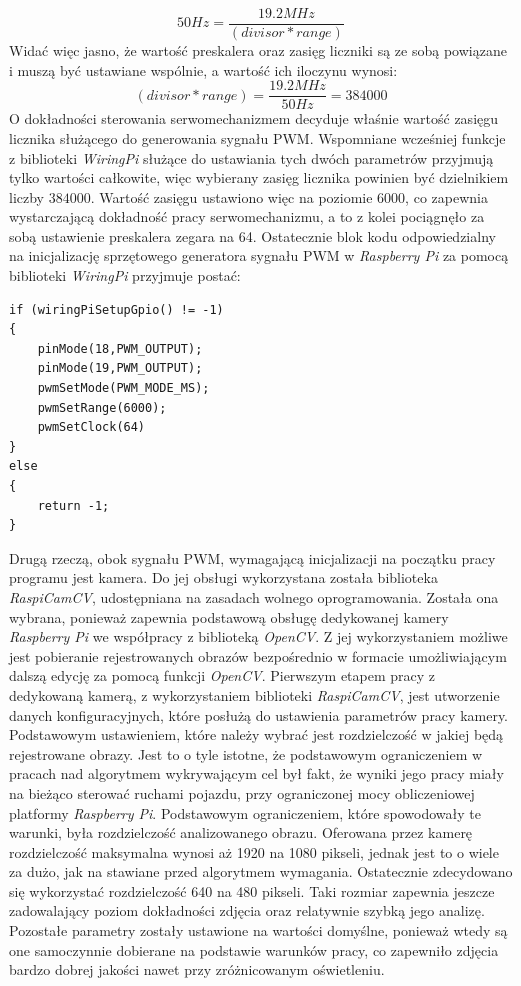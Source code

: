 \begin{equation}
50 Hz = \frac{19.2 MHz}{(divisor * range)}
\label{eq:hard_pwmN}
\end{equation}
Widać więc jasno, że wartość preskalera oraz zasięg liczniki są ze sobą powiązane i muszą być ustawiane wspólnie, a wartość ich iloczynu wynosi:
\begin{equation}
(divisor * range) = \frac{19.2 MHz}{50 Hz} = 384000
\label{eq:range_x_presc}
\end{equation}
O dokładności sterowania serwomechanizmem decyduje właśnie wartość zasięgu licznika służącego do generowania sygnału PWM. Wspomniane wcześniej funkcje z biblioteki \textit{WiringPi} służące do ustawiania tych dwóch parametrów przyjmują tylko wartości całkowite, więc wybierany zasięg licznika powinien być dzielnikiem liczby $384000$. Wartość zasięgu ustawiono więc na poziomie 6000, co zapewnia wystarczającą dokładność pracy serwomechanizmu, a to z kolei pociągnęło za sobą ustawienie preskalera zegara na 64. Ostatecznie blok kodu odpowiedzialny na inicjalizację sprzętowego generatora sygnału PWM w \textit{Raspberry Pi} za pomocą biblioteki \textit{WiringPi} przyjmuje postać:
\begin{lstlisting}[caption=Inicjalizacja sygnałów PWM \textit{Raspberry Pi}]
if (wiringPiSetupGpio() != -1)
{
	pinMode(18,PWM_OUTPUT);
	pinMode(19,PWM_OUTPUT);
	pwmSetMode(PWM_MODE_MS);
	pwmSetRange(6000);
	pwmSetClock(64)
}
else
{
	return -1;
}
\end{lstlisting}

Drugą rzeczą, obok sygnału PWM, wymagającą inicjalizacji na początku pracy programu jest kamera. Do jej obsługi wykorzystana została biblioteka \textit{RaspiCamCV}, udostępniana na zasadach wolnego oprogramowania. Została ona wybrana, ponieważ zapewnia podstawową obsługę dedykowanej kamery \textit{Raspberry Pi} we współpracy z biblioteką \textit{OpenCV}. Z jej wykorzystaniem możliwe jest pobieranie rejestrowanych obrazów bezpośrednio w formacie umożliwiającym dalszą edycję za pomocą funkcji \textit{OpenCV}. Pierwszym etapem pracy z dedykowaną kamerą, z wykorzystaniem biblioteki \textit{RaspiCamCV}, jest utworzenie danych konfiguracyjnych, które posłużą do ustawienia parametrów pracy kamery. Podstawowym ustawieniem, które należy wybrać jest rozdzielczość w jakiej będą rejestrowane obrazy. Jest to o tyle istotne, że podstawowym ograniczeniem w pracach nad algorytmem wykrywającym cel był fakt, że wyniki jego pracy miały na bieżąco sterować ruchami pojazdu, przy ograniczonej mocy obliczeniowej platformy \textit{Raspberry Pi}. Podstawowym ograniczeniem, które spowodowały te warunki, była rozdzielczość analizowanego obrazu. Oferowana przez kamerę rozdzielczość maksymalna wynosi aż 1920 na 1080 pikseli, jednak jest to o wiele za dużo, jak na stawiane przed algorytmem wymagania. Ostatecznie zdecydowano się wykorzystać rozdzielczość 640 na 480 pikseli. Taki rozmiar zapewnia jeszcze zadowalający poziom dokładności zdjęcia oraz relatywnie szybką jego analizę. Pozostałe parametry zostały ustawione na wartości domyślne, ponieważ wtedy są one samoczynnie dobierane na podstawie warunków pracy, co zapewniło zdjęcia bardzo dobrej jakości nawet przy zróżnicowanym oświetleniu.

